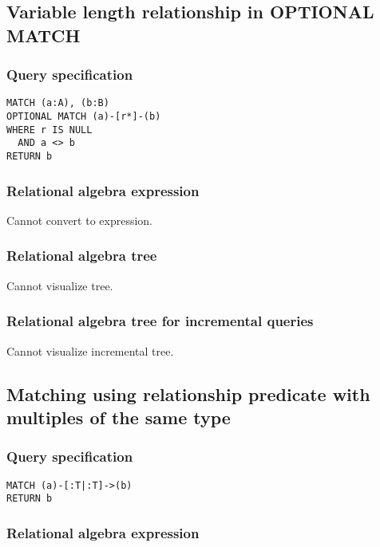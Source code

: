 \subsection{Variable length relationship in OPTIONAL MATCH}

\subsubsection*{Query specification}

\begin{lstlisting}
MATCH (a:A), (b:B)
OPTIONAL MATCH (a)-[r*]-(b)
WHERE r IS NULL
  AND a <> b
RETURN b
\end{lstlisting}

\subsubsection*{Relational algebra expression}

Cannot convert to expression.

\subsubsection*{Relational algebra tree}

Cannot visualize tree.

\subsubsection*{Relational algebra tree for incremental queries}

Cannot visualize incremental tree.

\subsection{Matching using relationship predicate with multiples of the same type}

\subsubsection*{Query specification}

\begin{lstlisting}
MATCH (a)-[:T|:T]->(b)
RETURN b
\end{lstlisting}

\subsubsection*{Relational algebra expression}

